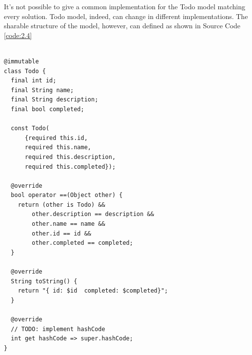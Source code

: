 It's not possible to give a common implementation for the Todo model matching every solution. Todo model, indeed, can change in different implementations. The sharable structure of the model, however, can defined as shown in Source Code \ref{code:2.4}
	\mbox{}\\
	\begin{code}
	
\label{code:2.4}
	\begin{verbatim}
	
@immutable
class Todo {
  final int id;
  final String name;
  final String description;
  final bool completed;

  const Todo(
      {required this.id,
      required this.name,
      required this.description,
      required this.completed});

  @override
  bool operator ==(Object other) {
    return (other is Todo) &&
        other.description == description &&
        other.name == name &&
        other.id == id &&
        other.completed == completed;
  }

  @override
  String toString() {
    return "{ id: $id  completed: $completed}";
  }

  @override
  // TODO: implement hashCode
  int get hashCode => super.hashCode;
}

	\end{verbatim}
	\end{code}
	
